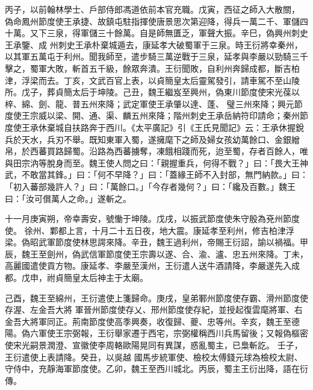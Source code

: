 \begin{pinyinscope}
丙子，以前翰林學士、戶部侍郎馮道依前本官充職。戊寅，西征之師入大散關，
 偽命鳳州節度使王承捷、故鎮屯駐指揮使唐景思次第迎降，得兵一萬二千、軍儲四十萬。又下三泉，得軍儲三十餘萬。自是師無匱乏，軍聲大振。辛巳，偽興州刺史王承鑒、成
 州刺史王承朴棄城遁去，康延孝大破蜀軍于三泉。時王衍將幸秦州，以其軍五萬屯于利州。聞我師至，遣步騎三萬逆戰于三泉，延孝與李嚴以勁騎三千擊之，蜀軍大敗，斬首五千級，餘眾奔潰。王衍聞敗，自利州奔歸成都，斷吉柏津，浮梁而去。丁亥，文武百官上表，以貞簡皇太后靈駕發引，請車駕不至山陵所。戊子，葬貞簡太后于坤陵。己丑，魏王繼岌至興州，偽東川節度使宋光葆以梓、綿、劍、龍、普五州來降；武定軍使王承肇以達、蓬、
 璧三州來降；興元節度使王宗威以梁、開、通、渠、麟五州來降；階州刺史王承岳納符印請命；秦州節度使王承休棄城自扶路奔于西川。《太平廣記》引《王氏見聞記》云：王承休握銳兵於天水，兵刃不舉。既知東軍入蜀，遂擁麾下之師及婦女孩幼萬餘口、金銀繒帛，於西蕃買路歸蜀。沿路為西蕃擄奪，凍餓相踐而死，迨至蜀，存者百餘人，唯與田宗汭等脫身而至。魏王使人問之曰：「親握重兵，何得不戰？」曰：「畏大王神武，不敢當其鋒。」曰：「何不早降？」曰：「蓋緣王師不入封部，無門納款。」曰：「初入蕃部幾許人？」曰：「萬餘口。」「今存者幾何？」曰：「纔及百數。」魏王曰：「汝可償萬人之命。」遂斬之。



 十一月庚寅朔，帝幸壽安，號慟于坤陵。戊戌，以振武節度使朱守殷為兗州節度使。
 徐州、鄴都上言，十月二十五日夜，地大震。康延孝至利州，修吉柏津浮梁。偽昭武軍節度使林思諤來降。辛丑，魏王過利州，帝賜王衍詔，諭以禍福。甲辰，魏王至劍州，偽武信軍節度使王宗壽以遂、合、渝、瀘、忠五州來降。丁未，高麗國遣使貢方物。康延孝、李嚴至漢州，王衍遣人送牛酒請降，李嚴遂先入成都。戊申，祔貞簡皇太后神主于太廟。


己酉，魏王至綿州，王衍遣使上箋歸命。庚戌，皇弟鄆州節度使存霸、滑州節度使存渥、左金吾大將
 軍晉州節度使存乂、邢州節度使存紀，並授起復雲麾將軍、右金吾大將軍同正。荊南節度使高季興奏，收復歸、夔、忠等州。辛亥，魏王至德陽。偽六軍使王宗弼報，王衍舉家遷于西宅，宗弼權稱西川兵馬留後；又報偽樞密使宋光嗣景潤澄、宣徽使李周輅歐陽晃同有異謀，惑亂蜀主，已梟斬訖。
 壬子，王衍遣使上表請降。癸丑，以吳越
 國馬步統軍使、檢校太傅錢元球為檢校太尉、守侍中，充靜海軍節度使。乙卯，魏王至西川城北。丙辰，蜀主王衍出降，語在衍傳。




\end{pinyinscope}
